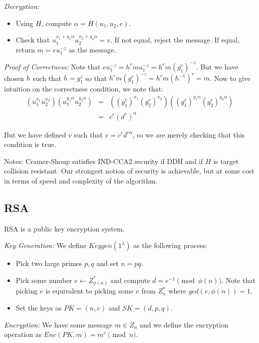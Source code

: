 \documentclass[psamsfonts]{amsart}
\begin{document}
\emph{Decryption:}
\begin{itemize}
  \item Using $H$, compute $\alpha = H(u_1, u_2, e)$.
  \item Check that $u_1^{x_1 + y_1 \alpha} u_2^{x_2 + y_2 \alpha} = v$. If not equal, reject the message. If equal, return $m = e u_1^{-z}$ as the message.
\end{itemize}

\emph{Proof of Correctness:} Note that $e u_1^{-z} = h^r m u_1^{-z} = h^r m (g_1^{r})^{-z}$. But we have chosen $h$ such that $h = g_1^z$ so that $h^r m (g_1^{r})^{-z} = h^r m (h^{-1})^r = m$. Now to give intuition on the correctness condition, we note that:
\begin{eqnarray}
  (u_1^{x_1} u_2^{x_2})(u_1^{y_1 \alpha} u_2^{y_2 \alpha}) &=& ((g_1^{r})^{x_1}(g_2^{r})^{x_2})((g_1^{r})^{y_1 \alpha} (g_2^{r})^{y_2 \alpha}) \\
                                                           &=& c^r (d^r)^\alpha
\end{eqnarray}

But we have defined $v$ such that $v = c^r d^{r \alpha}$, so we are merely checking that this condition is true.

Notes: Cramer-Shoup satisfies IND-CCA2 security if DDH and if $H$ is target collision resistant. Our strongest notion of security is achievable, but at some cost in terms of speed and conplexity of the algorithm.

\subsection{RSA}

RSA is a public key encryption system.

\emph{Key Generation:} We define $Keygen(1^\lambda)$ as the following process:
\begin{itemize}
  \item Pick two large primes $p,q$ and set $n = pq$.
  \item Pick some number $e \leftarrow Z_{\phi(n)}^*$ and compute $d = e^{-1} \pmod{\phi(n)}$. Note that picking $e$ is equivalent to picking some $e$ from $Z_n^*$ where $gcd(e, \phi(n)) = 1$.
  \item Set the keys as $PK = (n, e)$ and $SK = (d, p, q)$.
\end{itemize}

\emph{Encryption:} We have some message $m \in Z_n$ and we define the encryption operation as $Enc(PK, m) = m^e \pmod{n}$.
\end{document}
